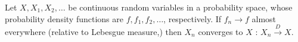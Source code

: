 \documentclass[12pt]{article}
\begin{document}
Let $X,X_1,X_2,\dots$ be continuous random variables in a probability space, whose probability density functions are $f,f_1,f_2,\dots$, respectively. If $f_n\rightarrow f$ almost everywhere (relative to Lebesgue measure,) then $X_n$ converges to $X$ : 
$X_n\xrightarrow[]{D} X$.
\end{document}

